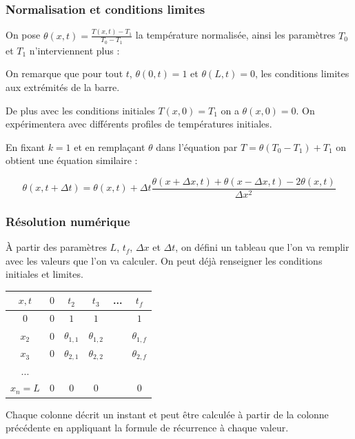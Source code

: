 \documentclass{beamer}
\begin{document}
    \begin{frame}
    \frametitle{Normalisation et conditions limites}


    On pose $\theta(x,t) = \frac{T(x,t) -T_1}{T_0 - T_1}$ la température normalisée,
    ainsi les paramètres $T_0$ et $T_1$ n'interviennent plus :

    \medskip

    On remarque que pour tout $t$, $\theta(0, t) = 1$ et $\theta(L, t) = 0$, les conditions limites aux extrémités de la barre.

    \medskip

    De plus avec les conditions initiales $T(x,0)=T_1$ on a $\theta(x, 0) = 0$. On expérimentera avec différents profiles de températures initiales.

    \bigskip

    En fixant $k = 1$ et en remplaçant $\theta$ dans l'équation par $T = \theta(T_0 - T_1) + T_1$ on obtient une équation similaire :

    $$\boxed{\theta(x, t + \Delta t) = \theta(x, t) + \Delta t \frac{\theta(x+ \Delta x, t) + \theta(x-\Delta x, t) -2\theta(x, t)}{\Delta x ^2 }}$$


    \end{frame}


    \begin{frame}
    \frametitle{Résolution numérique}

    À partir des paramètres $L$, $t_f$, $\Delta x$ et $\Delta t$, on défini un tableau que l'on va remplir avec les valeurs que l'on va calculer. On peut déjà renseigner les conditions initiales et limites.

    \begin{center}
	    \begin{tabular}{ |c|c|c|c|c|c| }
	     \hline
	     $x, t$ & $0$ & $t_2$ & $t_3$ & ... & $t_f$ \\
	     \hline
	     $0$   & $0$ & $1$ & $1$ &  & $1$\\
	     $x_2$ & $0$ & $\theta_{1,1}$ & $\theta_{1,2}$ &  & $\theta_{1,f}$\\
	     $x_3$ & $0$ & $\theta_{2,1}$ & $\theta_{2,2}$ &  & $\theta_{2,f}$\\
	     ... &   &   &   &  &  \\
	     $x_n = L$ &   $0$ & $0$ & $0$ &  & $0$\\
	     \hline
	    \end{tabular}
  	\end{center}

  	Chaque colonne décrit un instant et peut être calculée à partir de la colonne précédente en appliquant la formule de récurrence à chaque valeur.

    \end{frame}
\end{document}
